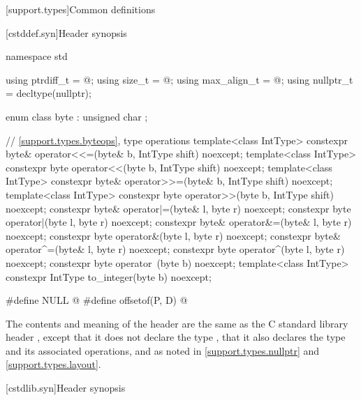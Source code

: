 [support.types]{Common definitions}

[cstddef.syn]{Header  synopsis}

%
%
%
%
%
%
%
\begin{codeblock}
namespace std {
  using ptrdiff_t = @\seebelow@;
  using size_t = @\seebelow@;
  using max_align_t = @\seebelow@;
  using nullptr_t = decltype(nullptr);

  enum class byte : unsigned char {};

  // \ref{support.types.byteops},  type operations
  template<class IntType>
    constexpr byte& operator<<=(byte& b, IntType shift) noexcept;
  template<class IntType>
    constexpr byte operator<<(byte b, IntType shift) noexcept;
  template<class IntType>
    constexpr byte& operator>>=(byte& b, IntType shift) noexcept;
  template<class IntType>
    constexpr byte operator>>(byte b, IntType shift) noexcept;
  constexpr byte& operator|=(byte& l, byte r) noexcept;
  constexpr byte operator|(byte l, byte r) noexcept;
  constexpr byte& operator&=(byte& l, byte r) noexcept;
  constexpr byte operator&(byte l, byte r) noexcept;
  constexpr byte& operator^=(byte& l, byte r) noexcept;
  constexpr byte operator^(byte l, byte r) noexcept;
  constexpr byte operator~(byte b) noexcept;
  template<class IntType>
    constexpr IntType to_integer(byte b) noexcept;
}

#define NULL @\seebelow@
#define offsetof(P, D) @\seebelow@
\end{codeblock}

\pnum
The contents and meaning of the header  are the same as
the C standard library header ,
except that it does not declare the type ,
that it also declares the type 
and its associated operations,
and as noted in
\ref{support.types.nullptr} and
\ref{support.types.layout}.


[cstdlib.syn]{Header  synopsis}

